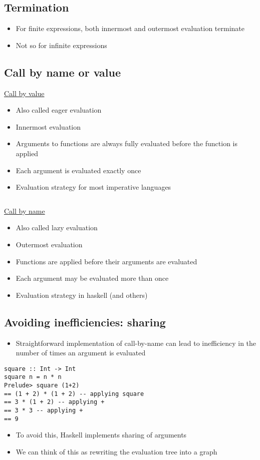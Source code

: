 \documentclass{article}[18pt]
\begin{document}
\subsection{Termination}
\begin{itemize}
	\item For finite expressions, both innermost and outermost evaluation terminate
	\item Not so for infinite expressions
\end{itemize}
\subsection{Call by name or value}
\begin{minipage}{0.45\textwidth}
\underline{Call by value}
\begin{itemize}
	\item Also called eager evaluation
	\item Innermost evaluation
	\item Arguments to functions are always fully evaluated before the function is applied
	\item Each argument is evaluated exactly once
	\item Evaluation strategy for most imperative languages
\end{itemize}
\end{minipage}
\begin{minipage}{0.1\textwidth}
$ $
\end{minipage}
\begin{minipage}{0.45\textwidth}
\underline{Call by name}
\begin{itemize}
	\item Also called lazy evaluation
	\item Outermost evaluation
	\item Functions are applied before their arguments are evaluated
	\item Each argument may be evaluated more than once
	\item Evaluation strategy in haskell (and others)
\end{itemize}
\end{minipage}
\subsection{Avoiding inefficiencies: sharing}
\begin{itemize}
	\item Straightforward implementation of call-by-name can lead to inefficiency in the number of times an argument is evaluated
\end{itemize}
\begin{verbatim}
square :: Int -> Int
square n = n * n
Prelude> square (1+2)
== (1 + 2) * (1 + 2) -- applying square
== 3 * (1 + 2) -- applying +
== 3 * 3 -- applying +
== 9
\end{verbatim}
\begin{itemize}
	\item To avoid this, Haskell implements sharing of arguments
	\item We can think of this as rewriting the evaluation tree into a graph
\end{itemize}
\end{document}

